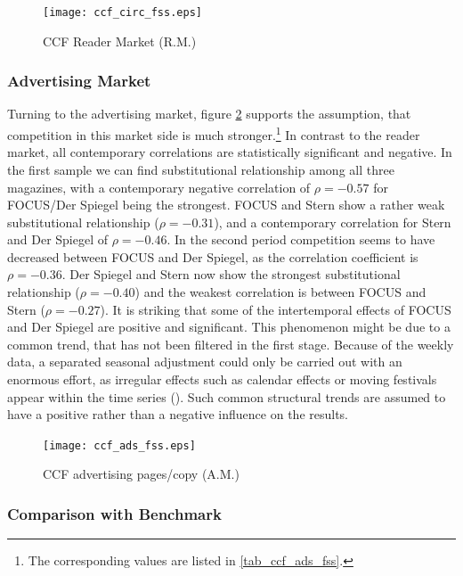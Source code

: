 \documentclass[12pt,a4paper,notitlepage]{article}
\begin{document}
\begin{figure}[H]
\caption{CCF Reader Market (R.M.)}
	\centering
	\texttt{[image: ccf\_circ\_fss.eps]}
\label{fig_ccf_circ_fss}
\end{figure}




\subsubsection{Advertising Market}
Turning to the advertising market, figure \ref{fig_ccf_ads_fss} supports the assumption, that competition in this market side is much stronger.\footnote{The corresponding values are listed in \ref{tab_ccf_ads_fss}.} In contrast to the reader market, all contemporary correlations are statistically significant and negative. In the first sample we can find substitutional relationship among all three magazines, with a contemporary negative correlation of $\rho=-0.57$ for FOCUS/Der Spiegel being the strongest. FOCUS and Stern show a rather weak substitutional relationship ($\rho=-0.31$), and a contemporary correlation for Stern and Der Spiegel of $\rho=-0.46$. In the second period competition seems to have decreased between FOCUS and Der Spiegel, as the correlation coefficient is $\rho=-0.36$. Der Spiegel and Stern now show the strongest substitutional relationship ($\rho=-0.40$) and the weakest correlation is between FOCUS and Stern ($\rho=-0.27$). It is striking that some of the intertemporal effects of FOCUS and Der Spiegel are positive and significant. This phenomenon might be due to a common trend, that has not been filtered in the first stage. Because of the weekly data, a separated seasonal adjustment could only be carried out with an enormous effort, as irregular effects such as calendar effects or moving festivals appear within the time series (\cite{harvey_modeling_1997}). Such common structural trends are assumed to have a positive rather than a negative influence on the results. 

\begin{figure}[H]
\caption{CCF advertising pages/copy (A.M.)}
	\centering
	\texttt{[image: ccf\_ads\_fss.eps]}
	\label{fig_ccf_ads_fss}
\end{figure}



\subsubsection{Comparison with Benchmark}
\end{document}

